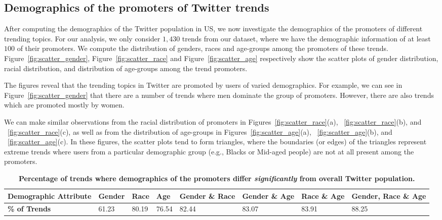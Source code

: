 \documentclass[letterpaper]{article}
\begin{document}
\subsection{Demographics of the promoters of Twitter trends}
\noindent
After computing the demographics of the Twitter population in US,
we now investigate the demographics
of the promoters of different trending topics.
For our analysis, we only consider $1,430$ trends from our dataset,
where we have the demographic information of at least $100$ of
their promoters.
We compute the distribution of genders, races and age-groups
among the promoters of these trends.
Figure~\ref{fig:scatter_gender}, Figure~\ref{fig:scatter_race} and Figure~\ref{fig:scatter_age}
respectively show the scatter plots of gender distribution, racial distribution, and distribution of
age-groups among the trend promoters.

The figures reveal that the trending topics in Twitter are promoted by
users of varied demographics. For example, we can see in Figure~\ref{fig:scatter_gender}
that there are a number of trends where men dominate the group of promoters. However,
there are also trends which are promoted mostly by women.

We can make similar observations from the racial distribution of
promoters in Figures~\ref{fig:scatter_race}(a), ~\ref{fig:scatter_race}(b), and
~\ref{fig:scatter_race}(c), as well as from the distribution of age-groups
in Figures~\ref{fig:scatter_age}(a), ~\ref{fig:scatter_age}(b), and
~\ref{fig:scatter_age}(c). In these figures, the scatter plots tend to form triangles,
where the boundaries (or edges) of the triangles represent extreme trends where
users from a particular demographic group (e.g., Blacks or Mid-aged people)
are not at all present among the promoters.

\begin{table*}[t]
\center
\small
\begin{tabular}{|p{}|p{}|p{}|p{}|p{}|p{}|p{}|p{}|}
\hline
{\bf Demographic Attribute} & {\bf Gender} & {\bf Race} & {\bf Age} & {\bf Gender \& Race} & {\bf Gender \& Age} & {\bf Race \& Age} & {\bf Gender, Race \& Age} \\
\hline
{\bf \% of Trends}  & 61.23 & 80.19 & 76.54 & 82.44 & 83.07 & 83.91 & 88.25 \\
\hline
\end{tabular}
\vspace*{-2mm}
\caption{{\bf Percentage of trends where demographics of the promoters differ {\it significantly} from overall Twitter population.}}
\label{tab:significantly_different}
\vspace*{-5mm}
\end{table*}
\end{document}
